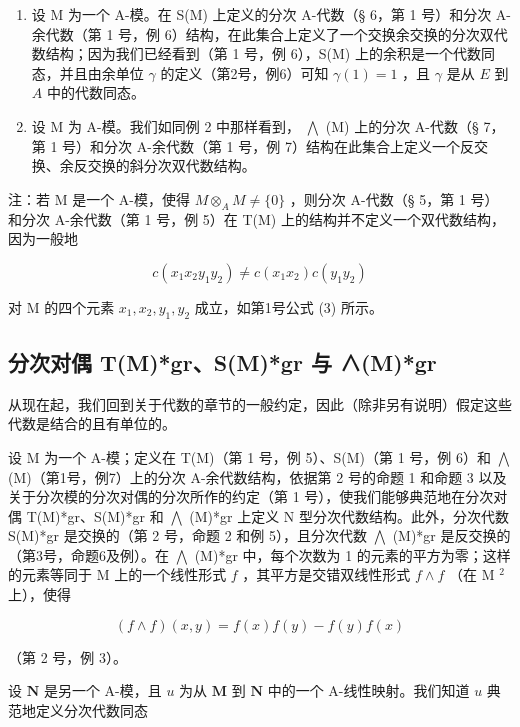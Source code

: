 \begin{enumerate}
\def\labelenumi{(\arabic{enumi})}
\setcounter{enumi}{1}
\item
  设 M 为一个 A-模。在 S(M) 上定义的分次 A-代数（§ 6，第 1 号）和分次 A-余代数（第 1 号，例 6）结构，在此集合上定义了一个交换余交换的分次双代数结构；因为我们已经看到（第 1 号，例 6），S(M) 上的余积是一个代数同态，并且由余单位 \(\gamma\) 的定义（第2号，例6）可知 \(\gamma(1) = 1\) ，且 \(\gamma\) 是从 \(E\) 到 \(A\) 中的代数同态。
\item
  设 M 为 A-模。我们如同例 2 中那样看到， \(\bigwedge\) (M) 上的分次 A-代数（§ 7，第 1 号）和分次 A-余代数（第 1 号，例 7）结构在此集合上定义一个反交换、余反交换的斜分次双代数结构。
\end{enumerate}

注：若 M 是一个 A-模，使得 \(M \otimes_{A} M \neq \{0\}\) ，则分次 A-代数（§ 5，第 1 号）和分次 A-余代数（第 1 号，例 5）在 T(M) 上的结构并不定义一个双代数结构，因为一般地

\[
c (x _ {1} x _ {2} y _ {1} y _ {2}) \neq c (x _ {1} x _ {2}) c (y _ {1} y _ {2})
\]

对 M 的四个元素 \(x_{1}, x_{2}, y_{1}, y_{2}\) 成立，如第1号公式 (3) 所示。

\subsection{分次对偶 T(M)*gr、S(M)*gr 与 ∧(M)*gr}

从现在起，我们回到关于代数的章节的一般约定，因此（除非另有说明）假定这些代数是结合的且有单位的。

设 M 为一个 A-模；定义在 T(M)（第 1 号，例 5）、S(M)（第 1 号，例 6）和 \(\bigwedge\) (M)（第1号，例7）上的分次 A-余代数结构，依据第 2 号的命题 1 和命题 3 以及关于分次模的分次对偶的分次所作的约定（第 1 号），使我们能够典范地在分次对偶 T(M)*gr、S(M)*gr 和 \(\bigwedge\) (M)*gr 上定义 N 型分次代数结构。此外，分次代数 S(M)*gr 是交换的（第 2 号，命题 2 和例 5），且分次代数 \(\bigwedge\) (M)*gr 是反交换的（第3号，命题6及例）。在 \(\bigwedge\) (M)*gr 中，每个次数为 1 的元素的平方为零；这样的元素等同于 M 上的一个线性形式 \(f\) ，其平方是交错双线性形式 \(f \wedge f\) （在 M \(^{2}\) 上），使得

\[
(f \wedge f) (x, y) = f (x) f (y) - f (y) f (x)
\]

（第 2 号，例 3）。

设 \(\mathbf{N}\) 是另一个 A-模，且 \(u\) 为从 \(\mathbf{M}\) 到 \(\mathbf{N}\) 中的一个 A-线性映射。我们知道 \(u\) 典范地定义分次代数同态

